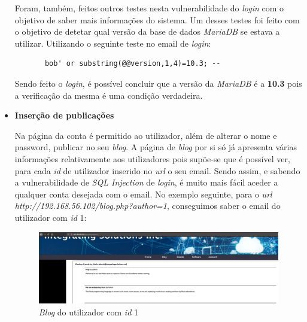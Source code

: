 \documentclass[10pt,english]{article}
\begin{document}
\begin{itemize}
    \clearpage
    
    
    \par Foram, também, feitos outros testes nesta vulnerabilidade do \textit{login} com o objetivo de saber mais informações do sistema. Um desses testes foi feito com o objetivo de detetar qual versão da base de dados \textit{MariaDB} se estava a utilizar. Utilizando o seguinte teste no email de \textit{login}:
    
    \begin{lstlisting}
       bob' or substring(@@version,1,4)=10.3; -- 
    \end{lstlisting}
    
    
    \par Sendo feito o \textit{login}, é possível concluir que a versão da \textit{MariaDB} é a \textbf{10.3} pois a verificação da mesma é uma condição verdadeira.
    
    
    
    \item {\textbf{Inserção de publicações}} 
    
    \par Na página da conta é permitido ao utilizador, além de alterar o nome e password, publicar no seu \textit{blog}. A página de \textit{blog} por si só já apresenta várias informações relativamente aos utilizadores pois supõe-se que é possível ver, para cada \textit{id} de utilizador inserido no \textit{url} o seu email. Sendo assim, e sabendo a vulnerabilidade de \textit{SQL Injection} de \textit{login}, é muito mais fácil aceder a qualquer conta desejada com o email. No exemplo seguinte, para o \textit{url} \textit{http://192.168.56.102/blog.php?author=1}, conseguimos saber o email do utilizador com \textit{id} 1:
    
    \begin{figure}[!h]
        \centering
        \includegraphics[width=\textwidth]{images/blog_1.png}
        \caption{\textit{Blog} do utilizador com \textit{id} 1}
    \end{figure}
    
    \clearpage
    

\end{itemize}
\end{document}
